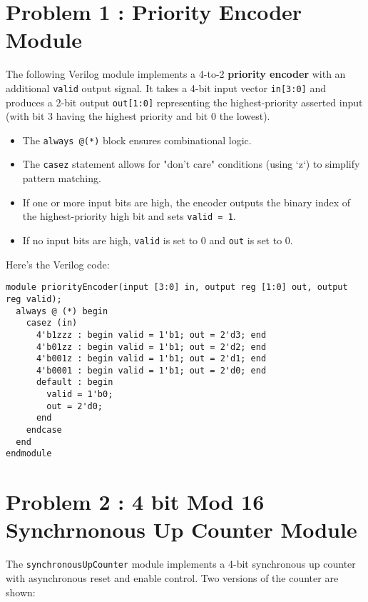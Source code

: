 \documentclass{article}
\begin{document}
\section*{Problem 1 : Priority Encoder Module}

The following Verilog module implements a 4-to-2 \textbf{priority encoder} with an additional \texttt{valid} output signal. It takes a 4-bit input vector \texttt{in[3:0]} and produces a 2-bit output \texttt{out[1:0]} representing the highest-priority asserted input (with bit 3 having the highest priority and bit 0 the lowest).

\begin{itemize}
	\item The \texttt{always @(*)} block ensures combinational logic.
	\item The \texttt{casez} statement allows for "don't care" conditions (using `z`) to simplify pattern matching.
	\item If one or more input bits are high, the encoder outputs the binary index of the highest-priority high bit and sets \texttt{valid = 1}.
	\item If no input bits are high, \texttt{valid} is set to 0 and \texttt{out} is set to 0.
\end{itemize}

\noindent Here's the Verilog code:

\begin{lstlisting}
module priorityEncoder(input [3:0] in, output reg [1:0] out, output reg valid);
  always @ (*) begin
    casez (in)
      4'b1zzz : begin valid = 1'b1; out = 2'd3; end
      4'b01zz : begin valid = 1'b1; out = 2'd2; end
      4'b001z : begin valid = 1'b1; out = 2'd1; end
      4'b0001 : begin valid = 1'b1; out = 2'd0; end
      default : begin
        valid = 1'b0;
        out = 2'd0;
      end
    endcase
  end
endmodule
\end{lstlisting}

\section*{Problem 2 : 4 bit Mod 16 Synchrnonous Up Counter Module}

The \texttt{synchronousUpCounter} module implements a 4-bit synchronous up counter with asynchronous reset and enable control. Two versions of the counter are shown:
\end{document}

